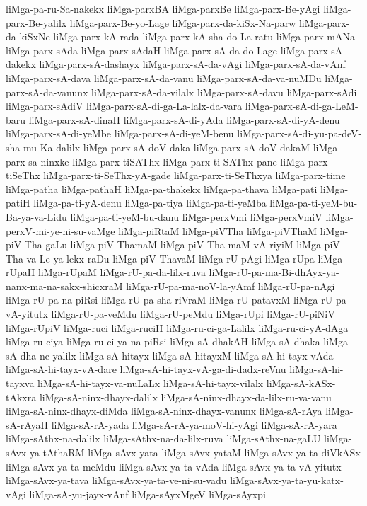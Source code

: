 {liMga-pa-ru-Sa-nakekx
liMga-parxBA
liMga-parxBe
liMga-parx-Be-yAgi
liMga-parx-Be-yalilx
liMga-parx-Be-yo-Lage
liMga-parx-da-kiSx-Na-parw
liMga-parx-da-kiSxNe
liMga-parx-kA-rada
liMga-parx-kA-sha-do-La-ratu
liMga-parx-mANa
liMga-parx-sAda
liMga-parx-sAdaH
liMga-parx-sA-da-do-Lage
liMga-parx-sA-dakekx
liMga-parx-sA-dashayx
liMga-parx-sA-da-vAgi
liMga-parx-sA-da-vAnf
liMga-parx-sA-dava
liMga-parx-sA-da-vanu
liMga-parx-sA-da-va-nuMDu
liMga-parx-sA-da-vanunx
liMga-parx-sA-da-vilalx
liMga-parx-sA-davu
liMga-parx-sAdi
liMga-parx-sAdiV
liMga-parx-sA-di-ga-La-lalx-da-vara
liMga-parx-sA-di-ga-LeM-baru
liMga-parx-sA-dinaH
liMga-parx-sA-di-yAda
liMga-parx-sA-di-yA-denu
liMga-parx-sA-di-yeMbe
liMga-parx-sA-di-yeM-benu
liMga-parx-sA-di-yu-pa-deV-sha-mu-Ka-dalilx
liMga-parx-sA-doV-daka
liMga-parx-sA-doV-dakaM
liMga-parx-sa-ninxke
liMga-parx-tiSAThx
liMga-parx-ti-SAThx-pane
liMga-parx-tiSeThx
liMga-parx-ti-SeThx-yA-gade
liMga-parx-ti-SeThxya
liMga-parx-time
liMga-patha
liMga-pathaH
liMga-pa-thakekx
liMga-pa-thava
liMga-pati
liMga-patiH
liMga-pa-ti-yA-denu
liMga-pa-tiya
liMga-pa-ti-yeMba
liMga-pa-ti-yeM-bu-Ba-ya-va-Lidu
liMga-pa-ti-yeM-bu-danu
liMga-perxVmi
liMga-perxVmiV
liMga-perxV-mi-ye-ni-su-vaMge
liMga-piRtaM
liMga-piVTha
liMga-piVThaM
liMga-piV-Tha-gaLu
liMga-piV-ThamaM
liMga-piV-Tha-maM-vA-riyiM
liMga-piV-Tha-va-Le-ya-lekx-raDu
liMga-piV-ThavaM
liMga-rU-pAgi
liMga-rUpa
liMga-rUpaH
liMga-rUpaM
liMga-rU-pa-da-lilx-ruva
liMga-rU-pa-ma-Bi-dhAyx-ya-nanx-ma-na-sakx-shicxraM
liMga-rU-pa-ma-noV-la-yAmf
liMga-rU-pa-nAgi
liMga-rU-pa-na-piRsi
liMga-rU-pa-sha-riVraM
liMga-rU-patavxM
liMga-rU-pa-vA-yitutx
liMga-rU-pa-veMdu
liMga-rU-peMdu
liMga-rUpi
liMga-rU-piNiV
liMga-rUpiV
liMga-ruci
liMga-ruciH
liMga-ru-ci-ga-Lalilx
liMga-ru-ci-yA-dAga
liMga-ru-ciya
liMga-ru-ci-ya-na-piRsi
liMga-sA-dhakAH
liMga-sA-dhaka
liMga-sA-dha-ne-yalilx
liMga-sA-hitayx
liMga-sA-hitayxM
liMga-sA-hi-tayx-vAda
liMga-sA-hi-tayx-vA-dare
liMga-sA-hi-tayx-vA-ga-di-dadx-reVnu
liMga-sA-hi-tayxva
liMga-sA-hi-tayx-va-nuLaLx
liMga-sA-hi-tayx-vilalx
liMga-sA-kASx-tAkxra
liMga-sA-ninx-dhayx-dalilx
liMga-sA-ninx-dhayx-da-lilx-ru-va-vanu
liMga-sA-ninx-dhayx-diMda
liMga-sA-ninx-dhayx-vanunx
liMga-sA-rAya
liMga-sA-rAyaH
liMga-sA-rA-yada
liMga-sA-rA-ya-moV-hi-yAgi
liMga-sA-rA-yara
liMga-sAthx-na-dalilx
liMga-sAthx-na-da-lilx-ruva
liMga-sAthx-na-gaLU
liMga-sAvx-ya-tAthaRM
liMga-sAvx-yata
liMga-sAvx-yataM
liMga-sAvx-ya-ta-diVkASx
liMga-sAvx-ya-ta-meMdu
liMga-sAvx-ya-ta-vAda
liMga-sAvx-ya-ta-vA-yitutx
liMga-sAvx-ya-tava
liMga-sAvx-ya-ta-ve-ni-su-vadu
liMga-sAvx-ya-ta-yu-katx-vAgi
liMga-sA-yu-jayx-vAnf
liMga-sAyxMgeV
liMga-sAyxpi
}
